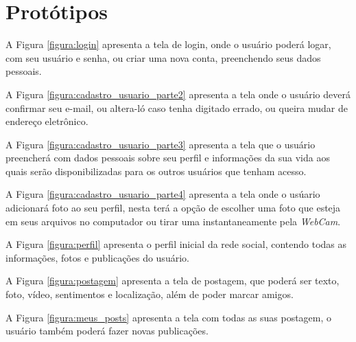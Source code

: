 \chapter{Protótipos}

A Figura \ref{figura:login} apresenta a tela de login, onde o usuário poderá logar, com seu usuário e senha, ou criar uma nova conta, preenchendo seus dados pessoais.


A Figura \ref{figura:cadastro_usuario_parte2} apresenta a tela onde o usuário deverá confirmar seu e-mail, ou altera-ló caso tenha digitado errado, ou queira mudar de endereço eletrônico.


A Figura \ref{figura:cadastro_usuario_parte3} apresenta a tela que o usuário preencherá com dados pessoais sobre seu perfil e informações da sua vida aos quais serão disponibilizadas para os outros usuários que tenham acesso.


A Figura \ref{figura:cadastro_usuario_parte4} apresenta a tela onde o usúario adicionará foto ao seu perfil, nesta terá a opção de escolher uma foto que esteja em seus arquivos no computador ou tirar uma instantaneamente pela \textit{WebCam}.


A Figura \ref{figura:perfil} apresenta o perfil inicial da rede social, contendo todas as informações, fotos e publicações do usuário.


A Figura \ref{figura:postagem} apresenta a tela de postagem, que poderá ser texto, foto, vídeo, sentimentos e localização, além de poder marcar amigos.


A Figura \ref{figura:meus_posts} apresenta a tela com todas as suas postagem, o usuário também poderá fazer novas publicações.

